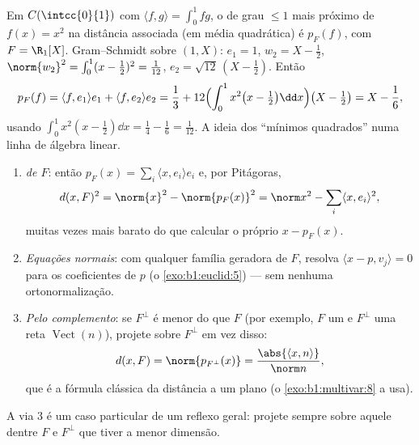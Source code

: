\begin{example}\label{ex:b1:euclid:bestapprox}
Em $C(\intcc{0}{1})$ com $\langle f, g\rangle = \int_0^1 fg$, o  de grau $\leq 1$ mais próximo de
$f(x) = x^2$ na distância associada (em média quadrática) é $p_F(f)$, com
$F = \R_1[X]$. Gram--Schmidt sobre $(1, X)$: $e_1 = 1$, $w_2 = X - \frac12$, $\norm{w_2}^2 = \int_0^1 (x - \frac12)^2 = \frac{1}{12}$, $e_2 =
\sqrt{12}\,(X - \tfrac12)$.
Então
\[
p_F(f) = \langle f, e_1\rangle e_1 + \langle f, e_2\rangle e_2
= \frac13 + 12\Bigl(\int_0^1 x^2\bigl(x - \tfrac12\bigr)\dd
x\Bigr)\bigl(X - \tfrac12\bigr)
= X - \frac{1}{6},
\]
usando $\int_0^1 x^2(x - \frac12)\dd x = \frac14 - \frac16 =
\frac{1}{12}$. A ideia dos ``mínimos quadrados'' numa linha de
álgebra linear.
\end{example}

\begin{method}
\label{met:b1:euclid:distance}
\begin{enumerate}
  \item \emph{  de $F$}: então $p_F(x) = \sum_i
        \langle x, e_i\rangle e_i$ e, por Pitágoras,
        \[
        d(x, F)^2 = \norm{x}^2 - \norm{p_F(x)}^2
        = \norm x^2 - \sum_i \langle x, e_i\rangle^2 ,
        \]
        muitas vezes mais barato do que calcular o próprio $x - p_F(x)$.
  \item \emph{Equações normais}: com qualquer família geradora de
        $F$, resolva $\langle x - p, v_j\rangle = 0$ para os coeficientes de $p$ (o \cref{exo:b1:euclid:5}) ---
        sem nenhuma ortonormalização.
  \item \emph{Pelo complemento}: se $F^\perp$ é menor do que $F$
        (por exemplo, $F$ um  e $F^\perp$ uma reta
        $\operatorname{Vect}(n)$), projete sobre $F^\perp$ em vez disso:
        \[
        d(x, F) = \norm{p_{F^\perp}(x)} =
        \frac{\abs{\langle x, n\rangle}}{\norm n} ,
        \]
        que é a fórmula clássica da distância a um plano (o \cref{exo:b1:multivar:8} a
        usa).
\end{enumerate}
A via 3 é um caso particular de um reflexo geral: projete sempre
sobre aquele dentre $F$ e $F^\perp$ que tiver a menor dimensão.
\end{method}

